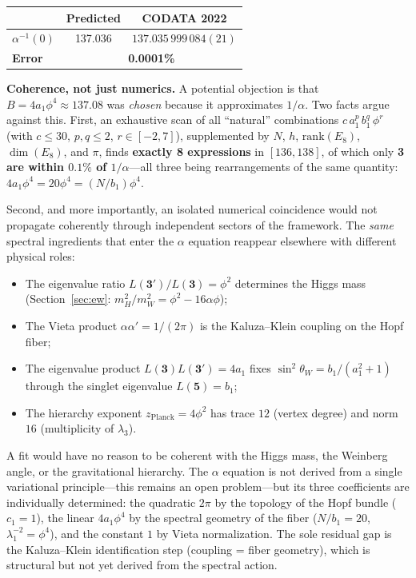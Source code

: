 \documentclass[12pt,a4paper]{article}
\theoremstyle{definition}
\begin{document}
\begin{center}
\begin{tabular}{lcc}
\toprule
& \textbf{Predicted} & \textbf{CODATA 2022} \\
\midrule
$\alpha^{-1}(0)$ & 137.036 & $137.035\,999\,084(21)$ \\
\textbf{Error} & \multicolumn{2}{c}{\textbf{0.0001\%}} \\
\bottomrule
\end{tabular}
\end{center}

\textbf{Coherence, not just numerics.}  A potential objection is that $B = 4a_1\phi^4 \approx 137.08$ was \emph{chosen} because it approximates $1/\alpha$.  Two facts argue against this.  First, an exhaustive scan of all ``natural'' combinations $c\,a_1^p\,b_1^q\,\phi^r$ (with $c \leq 30$, $p, q \leq 2$, $r \in [-2,7]$), supplemented by $N$, $h$, $\mathrm{rank}(E_8)$, $\dim(E_8)$, and $\pi$, finds \textbf{exactly 8 expressions} in $[136, 138]$, of which only \textbf{3 are within $0.1\%$ of $1/\alpha$}---all three being rearrangements of the same quantity: $4a_1\phi^4 = 20\phi^4 = (N/b_1)\phi^4$.

Second, and more importantly, an isolated numerical coincidence would not propagate coherently through independent sectors of the framework.  The \emph{same} spectral ingredients that enter the $\alpha$ equation reappear elsewhere with different physical roles:
\begin{itemize}
\item The eigenvalue ratio $L(\mathbf{3'})/L(\mathbf{3}) = \phi^2$ determines the Higgs mass (Section~\ref{sec:ew}: $m_H^2/m_W^2 = \phi^2 - 16\alpha\phi$);
\item The Vieta product $\alpha\alpha' = 1/(2\pi)$ is the Kaluza--Klein coupling on the Hopf fiber;
\item The eigenvalue product $L(\mathbf{3})L(\mathbf{3'}) = 4a_1$ fixes $\sin^2\theta_W = b_1/(a_1^2+1)$ through the singlet eigenvalue $L(\mathbf{5}) = b_1$;
\item The hierarchy exponent $z_{\mathrm{Planck}} = 4\phi^2$ has trace $12$ (vertex degree) and norm $16$ (multiplicity of $\lambda_3$).
\end{itemize}
A fit would have no reason to be coherent with the Higgs mass, the Weinberg angle, or the gravitational hierarchy.  The $\alpha$ equation is not derived from a single variational principle---this remains an open problem---but its three coefficients are individually determined: the quadratic $2\pi$ by the topology of the Hopf bundle ($c_1 = 1$), the linear $4a_1\phi^4$ by the spectral geometry of the fiber ($N/b_1 = 20$, $\lambda_1^{-2} = \phi^4$), and the constant $1$ by Vieta normalization.  The sole residual gap is the Kaluza--Klein identification step (coupling = fiber geometry), which is structural but not yet derived from the spectral action.
\end{document}

